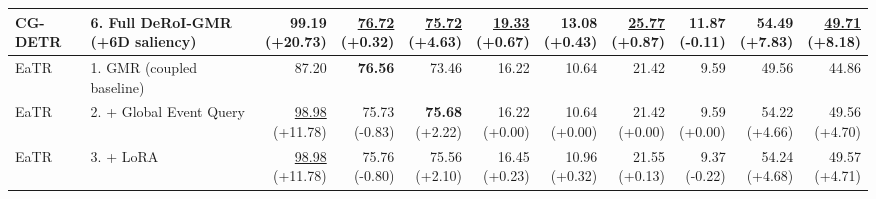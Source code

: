 \documentclass{article}
\begin{document}
{\begin{tabular}{llrrrrrrrrr}
CG-DETR & 6. Full DeRoI-GMR (+6D saliency) & \shortstack{\textbf{99.19} \\ {\scriptsize (+20.73)}} & \shortstack{\underline{76.72} \\ {\scriptsize (+0.32)}} & \shortstack{\underline{75.72} \\ {\scriptsize (+4.63)}} & \shortstack{\underline{19.33} \\ {\scriptsize (+0.67)}} & \shortstack{13.08 \\ {\scriptsize (+0.43)}} & \shortstack{\underline{25.77} \\ {\scriptsize (+0.87)}} & \shortstack{11.87 \\ {\scriptsize (-0.11)}} & \shortstack{54.49 \\ {\scriptsize (+7.83)}} & \shortstack{\underline{49.71} \\ {\scriptsize (+8.18)}} \\
\midrule
EaTR & 1. GMR (coupled baseline) & 87.20 & \textbf{76.56} & 73.46 & 16.22 & 10.64 & 21.42 & 9.59 & 49.56 & 44.86 \\
EaTR & 2. + Global Event Query & \shortstack{\underline{98.98} \\ {\scriptsize (+11.78)}} & \shortstack{75.73 \\ {\scriptsize (-0.83)}} & \shortstack{\textbf{75.68} \\ {\scriptsize (+2.22)}} & \shortstack{16.22 \\ {\scriptsize (+0.00)}} & \shortstack{10.64 \\ {\scriptsize (+0.00)}} & \shortstack{21.42 \\ {\scriptsize (+0.00)}} & \shortstack{9.59 \\ {\scriptsize (+0.00)}} & \shortstack{54.22 \\ {\scriptsize (+4.66)}} & \shortstack{49.56 \\ {\scriptsize (+4.70)}} \\
EaTR & 3. + LoRA & \shortstack{\underline{98.98} \\ {\scriptsize (+11.78)}} & \shortstack{75.76 \\ {\scriptsize (-0.80)}} & \shortstack{75.56 \\ {\scriptsize (+2.10)}} & \shortstack{16.45 \\ {\scriptsize (+0.23)}} & \shortstack{10.96 \\ {\scriptsize (+0.32)}} & \shortstack{21.55 \\ {\scriptsize (+0.13)}} & \shortstack{9.37 \\ {\scriptsize (-0.22)}} & \shortstack{54.24 \\ {\scriptsize (+4.68)}} & \shortstack{49.57 \\ {\scriptsize (+4.71)}} \\

\end{tabular}}
\end{document}
